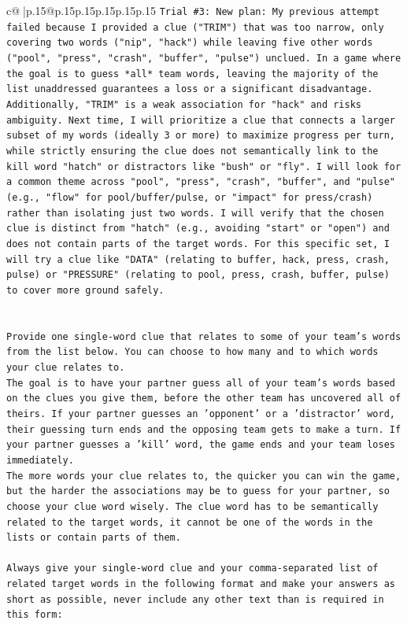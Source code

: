 \documentclass{article}
\begin{document}
{\begin{supertabular}{c@{$\;$}|p{.15\linewidth}@{}p{.15\linewidth}p{.15\linewidth}p{.15\linewidth}p{.15\linewidth}p{.15\linewidth}}
{{{\texttt{Trial \#3: New plan: My previous attempt failed because I provided a clue ("TRIM") that was too narrow, only covering two words ("nip", "hack") while leaving five other words ("pool", "press", "crash", "buffer", "pulse") unclued. In a game where the goal is to guess *all* team words, leaving the majority of the list unaddressed guarantees a loss or a significant disadvantage. Additionally, "TRIM" is a weak association for "hack" and risks ambiguity. Next time, I will prioritize a clue that connects a larger subset of my words (ideally 3 or more) to maximize progress per turn, while strictly ensuring the clue does not semantically link to the kill word "hatch" or distractors like "bush" or "fly". I will look for a common theme across "pool", "press", "crash", "buffer", and "pulse" (e.g., "flow" for pool/buffer/pulse, or "impact" for press/crash) rather than isolating just two words. I will verify that the chosen clue is distinct from "hatch" (e.g., avoiding "start" or "open") and does not contain parts of the target words. For this specific set, I will try a clue like "DATA" (relating to buffer, hack, press, crash, pulse) or "PRESSURE" (relating to pool, press, crash, buffer, pulse) to cover more ground safely.} \\
\\ 
\\ 
\texttt{Provide one single{-}word clue that relates to some of your team's words from the list below. You can choose to how many and to which words your clue relates to.} \\
\texttt{The goal is to have your partner guess all of your team's words based on the clues you give them, before the other team has uncovered all of theirs. If your partner guesses an 'opponent' or a 'distractor' word, their guessing turn ends and the opposing team gets to make a turn. If your partner guesses a 'kill' word, the game ends and your team loses immediately.} \\
\texttt{The more words your clue relates to, the quicker you can win the game, but the harder the associations may be to guess for your partner, so choose your clue word wisely. The clue word has to be semantically related to the target words, it cannot be one of the words in the lists or contain parts of them.} \\
\\ 
\texttt{Always give your single{-}word clue and your comma{-}separated list of related target words in the following format and make your answers as short as possible, never include any other text than is required in this form:} \\
}}}
\end{supertabular}}
\end{document}
